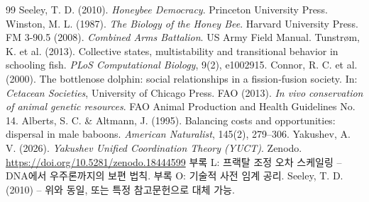 \documentclass[12pt]{article}
\theoremstyle{remark}
\begin{document}
	\begin{thebibliography}{99}
		 Seeley, T. D. (2010). \emph{Honeybee Democracy}. Princeton University Press.
		 Winston, M. L. (1987). \emph{The Biology of the Honey Bee}. Harvard University Press.
		 FM 3-90.5 (2008). \emph{Combined Arms Battalion}. US Army Field Manual.
		 Tunstrøm, K. et al. (2013). Collective states, multistability and transitional behavior in schooling fish. \emph{PLoS Computational Biology}, 9(2), e1002915.
		 Connor, R. C. et al. (2000). The bottlenose dolphin: social relationships in a fission‑fusion society. In: \emph{Cetacean Societies}, University of Chicago Press.
		 FAO (2013). \emph{In vivo conservation of animal genetic resources}. FAO Animal Production and Health Guidelines No. 14.
		 Alberts, S. C. \& Altmann, J. (1995). Balancing costs and opportunities: dispersal in male baboons. \emph{American Naturalist}, 145(2), 279–306.
		 Yakushev, A. V. (2026). \emph{Yakushev Unified Coordination Theory (YUCT)}. Zenodo. \url{https://doi.org/10.5281/zenodo.18444599}
		 부록 L: 프랙탈 조정 오차 스케일링 – DNA에서 우주론까지의 보편 법칙.
		 부록 O: 기술적 사전 임계 공리.
		 Seeley, T. D. (2010) – 위와 동일, 또는 특정 참고문헌으로 대체 가능.
	\end{thebibliography}
	
\end{document}

